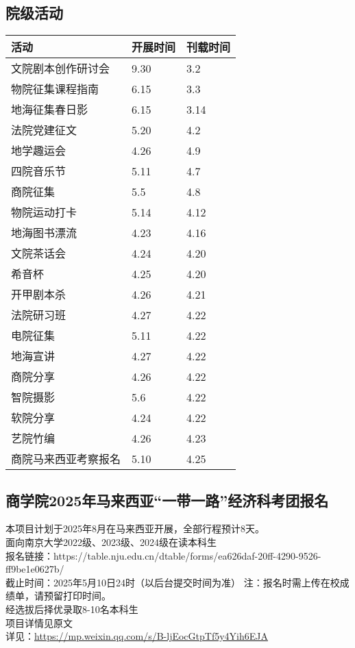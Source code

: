 \documentclass[letterpaper, 12pt]{article}
\begin{document}
\begin{multicols}{2}
\section{院级活动}
\begin{tabular}{|>{\centering\arraybackslash}m{}|m{}|m{}|}
\hline
    活动 & 开展时间 & 刊载时间\\
    \hline\hline
    文院剧本创作研讨会 & 9.30 & 3.2\\
    物院征集课程指南 & 6.15 & 3.3\\
    地海征集春日影 & 6.15 & 3.14\\
    法院党建征文 & 5.20 & 4.2\\
    地学趣运会 & 4.26 & 4.9\\
    四院音乐节 & 5.11 & 4.7\\
    商院征集 & 5.5 & 4.8\\
    物院运动打卡 & 5.14 & 4.12\\
    地海图书漂流 & 4.23 & 4.16\\
    文院茶话会 & 4.24 & 4.20\\
    希音杯 & 4.25 & 4.20\\
    开甲剧本杀 & 4.26 & 4.21\\
    法院研习班 & 4.27 & 4.22\\
    电院征集 & 5.11 & 4.22\\
    地海宣讲 & 4.27 & 4.22\\
    商院分享 & 4.26 & 4.22\\
    智院摄影 & 5.6 & 4.22\\
    软院分享 & 4.24 & 4.22\\
    艺院竹编 & 4.26 & 4.23\\
    商院马来西亚考察报名 & 5.10 & 4.25\\
    \hline
\end{tabular}

\subsection{商学院2025年马来西亚“一带一路”经济科考团报名} %
本项目计划于2025年8月在马来西亚开展，全部行程预计8天。
\\面向南京大学2022级、2023级、2024级在读本科生
\\报名链接：https://table.nju.edu.cn/dtable/forms/ea626daf-20ff-4290-9526-ff9be1e0627b/
\\截止时间：2025年5月10日24时（以后台提交时间为准） 注：报名时需上传在校成绩单，请预留打印时间。
\\经选拔后择优录取8-10名本科生
\\项目详情见原文
\\详见：\url{https://mp.weixin.qq.com/s/B-ljEocGtpTf5y4Yih6EJA}


\end{multicols}
\end{document}
